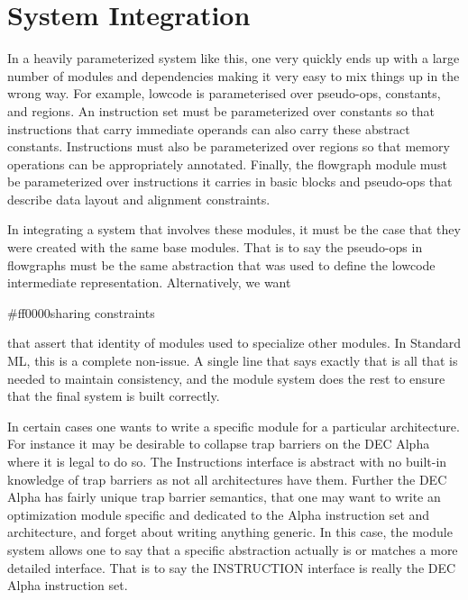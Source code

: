 \section{System Integration}
  In a heavily parameterized system like this, one very quickly ends up
  with a large number of modules and dependencies making it very
  easy to mix things up in the wrong way.  
   For example, lowcode is parameterised over pseudo-ops,
  constants, and regions. An instruction set must be parameterized
  over constants so that instructions that carry immediate operands
  can also carry these abstract constants. Instructions must also be
  parameterized over regions so that memory operations can be
  appropriately annotated. Finally, the flowgraph module must be
  parameterized over instructions it carries in basic blocks and
  pseudo-ops that describe data layout and alignment constraints.

  In integrating a system that involves these modules, it must be the
  case that they were created with the same base modules. That is to
  say the pseudo-ops in flowgraphs must be the same abstraction that
  was used to define the lowcode intermediate
  representation. Alternatively, we want 
  \begin{color}{#ff0000}sharing constraints\end{color} 
  that assert that identity of modules used to
  specialize other modules. In Standard ML, this is a complete
  non-issue. A single line that says exactly that is all that is
  needed to maintain consistency, and the module system does the rest
  to ensure that the final system is built correctly.

  In certain cases one wants to write a specific module for a
  particular architecture. For instance it may be desirable to collapse
  trap barriers on the DEC Alpha where it is legal to do so. The
  Instructions interface is abstract with no built-in knowledge of 
  trap barriers as not all architectures have them.
  Further the DEC Alpha has fairly unique trap barrier semantics,
  that one may want to write an optimization module specific and
  dedicated to the Alpha instruction set and architecture, and forget
  about writing anything generic. In this case, the module
  system allows one to say that a specific abstraction actually is or
  matches a more detailed interface. That is to say the INSTRUCTION
  interface is really the DEC Alpha instruction set.
